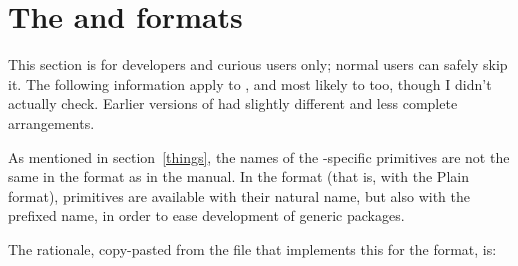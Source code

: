 \documentclass{lltxdoc}
\begin{document}

\section{The  and  formats}\label{formats}

This section is for developers and curious users only; normal users can safely
skip it. The following information apply to , and most likely to
 too, though I didn't actually check. Earlier versions of \texlive
had slightly different and less complete arrangements.

As mentioned in section~\ref{things}, the names of the \luatex-specific
primitives are not the same in the  format as in the \luatex
manual. In the  format (that is, \luatex with the Plain format),
primitives are available with their natural name, but also with the prefixed
name, in order to ease development of generic packages.

The rationale, copy-pasted from the file  that
implements this for the  format, is:
\end{document}
